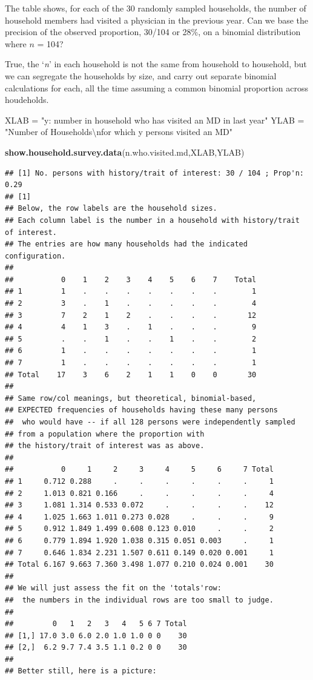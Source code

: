 \documentclass[]{book}
\newenvironment{Shaded}{\begin{snugshade}}{\end{snugshade}}
\newcommand{\CharTok}[1]{\textcolor[rgb]{0.31,0.60,0.02}{#1}}
\newcommand{\KeywordTok}[1]{\textcolor[rgb]{0.13,0.29,0.53}{\textbf{#1}}}
\newcommand{\NormalTok}[1]{#1}
\newcommand{\StringTok}[1]{\textcolor[rgb]{0.31,0.60,0.02}{#1}}
\begin{document}
The table shows, for each of the 30 randomly sampled households, the number of household members had visited a physician in the previous year. Can we base the precision of the observed proportion, 30/104 or 28\%, on a binomial distribution where \(n\) = 104?

True, the `\emph{n}' in each household is not the same from household to household, but we can segregate the households by size, and carry out separate binomial calculations for each, all the time assuming a common binomial proportion across houdeholds.

\begin{Shaded}
\begin{Highlighting}[]
\NormalTok{XLAB =}\StringTok{ "y: number in household who has visited an MD in last year"}
\NormalTok{YLAB =}\StringTok{ "Number of Households}\CharTok{\textbackslash{}n}\StringTok{for which y persons visited an MD"}

\KeywordTok{show.household.survey.data}\NormalTok{(n.who.visited.md,XLAB,YLAB)}
\end{Highlighting}
\end{Shaded}

\begin{verbatim}
## [1] No. persons with history/trait of interest: 30 / 104 ; Prop'n: 0.29
## [1]  
## Below, the row labels are the household sizes.
## Each column label is the number in a household with history/trait of interest.
## The entries are how many households had the indicated configuration.
## 
##           0    1    2    3    4    5    6    7    Total
## 1         1    .    .    .    .    .    .    .        1
## 2         3    .    1    .    .    .    .    .        4
## 3         7    2    1    2    .    .    .    .       12
## 4         4    1    3    .    1    .    .    .        9
## 5         .    .    1    .    .    1    .    .        2
## 6         1    .    .    .    .    .    .    .        1
## 7         1    .    .    .    .    .    .    .        1
## Total    17    3    6    2    1    1    0    0       30
## 
## Same row/col meanings, but theoretical, binomial-based,
## EXPECTED frequencies of households having these many persons
##  who would have -- if all 128 persons were independently sampled
## from a population where the proportion with 
## the history/trait of interest was as above.
## 
##           0     1     2     3     4     5     6     7 Total
## 1     0.712 0.288     .     .     .     .     .     .     1
## 2     1.013 0.821 0.166     .     .     .     .     .     4
## 3     1.081 1.314 0.533 0.072     .     .     .     .    12
## 4     1.025 1.663 1.011 0.273 0.028     .     .     .     9
## 5     0.912 1.849 1.499 0.608 0.123 0.010     .     .     2
## 6     0.779 1.894 1.920 1.038 0.315 0.051 0.003     .     1
## 7     0.646 1.834 2.231 1.507 0.611 0.149 0.020 0.001     1
## Total 6.167 9.663 7.360 3.498 1.077 0.210 0.024 0.001    30
## 
## We will just assess the fit on the 'totals'row:
##  the numbers in the individual rows are too small to judge.
## 
##         0   1   2   3   4   5 6 7 Total
## [1,] 17.0 3.0 6.0 2.0 1.0 1.0 0 0    30
## [2,]  6.2 9.7 7.4 3.5 1.1 0.2 0 0    30
## 
## Better still, here is a picture:
\end{verbatim}
\end{document}
